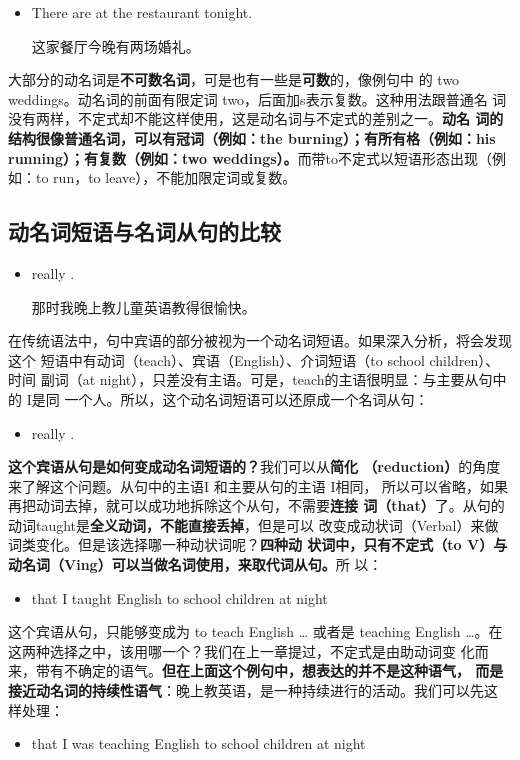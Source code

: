 \begin{itemize}
\item  There are  at the restaurant tonight.

这家餐厅今晚有两场婚礼。
\end{itemize}

大部分的动名词是\textbf{不可数名词}，可是也有一些是\textbf{可数}的，像例句中
的 two weddings。动名词的前面有限定词 two，后面加s表示复数。这种用法跟普通名
词没有两样，不定式却不能这样使用，这是动名词与不定式的差别之一。\textbf{动名
  词的结构很像普通名词，可以有冠词（例如：the burning）；有所有格（例如：his
  running）；有复数（例如：two weddings）。}而带to不定式以短语形态出现（例
如：to run，to leave），不能加限定词或复数。

\subsection{动名词短语与名词从句的比较}

\begin{itemize}
\item  {} really  .

  那时我晚上教儿童英语教得很愉快。
\end{itemize}

在传统语法中，句中宾语的部分被视为一个动名词短语。如果深入分析，将会发现这个
短语中有动词（teach）、宾语（English）、介词短语（to school children）、时间
副词（at night），只差没有主语。可是，teach的主语很明显：与主要从句中的 I是同
一个人。所以，这个动名词短语可以还原成一个名词从句：

\begin{itemize}
\item {} really  .
\end{itemize}

\textbf{这个宾语从句是如何变成动名词短语的？}我们可以从\textbf{简化
  （reduction）}的角度来了解这个问题。从句中的主语I 和主要从句的主语 I相同，
所以可以省略，如果再把动词去掉，就可以成功地拆除这个从句，不需要\textbf{连接
  词（that）}了。从句的动词taught是\textbf{全义动词，不能直接丢掉}，但是可以
改变成动状词（Verbal）来做词类变化。但是该选择哪一种动状词呢？\textbf{四种动
  状词中，只有不定式（to V）与动名词（Ving）可以当做名词使用，来取代词从句。}所
以：
\begin{itemize}
\item that I taught English to school children at night
\end{itemize}
这个宾语从句，只能够变成为 to teach English \ldots{} 或者是 teaching English
\ldots{}。在这两种选择之中，该用哪一个？我们在上一章提过，不定式是由助动词变
化而来，带有不确定的语气。\textbf{但在上面这个例句中，想表达的并不是这种语气，
  而是接近动名词的持续性语气}：晚上教英语，是一种持续进行的活动。我们可以先这
样处理：
\begin{itemize}
\item  that I was teaching English to school children at night
\end{itemize}

